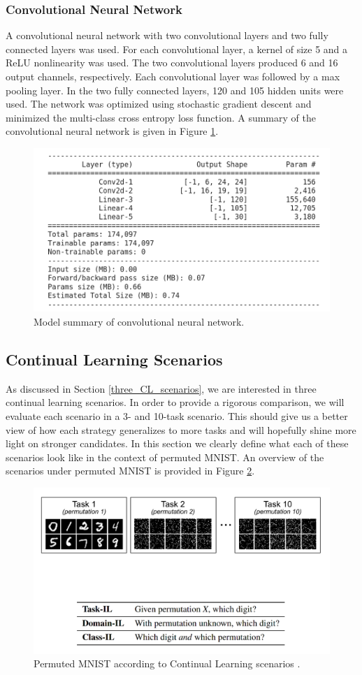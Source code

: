\documentclass{article}
\begin{document}
\subsubsection{Convolutional Neural Network}
A convolutional neural network with two convolutional layers and two fully connected layers was used. For each convolutional layer, a kernel of size 5 and a ReLU nonlinearity was used. The two convolutional layers produced 6 and 16 output channels, respectively. Each convolutional layer was followed by a max pooling layer. In the two fully connected layers, 120 and 105 hidden units were used. The network was optimized using stochastic gradient descent and minimized the multi-class cross entropy loss function. A summary of the convolutional neural network is given in Figure \ref{fig:CNN}. 

\begin{figure}[h]
	\centering
    \includegraphics[width=0.60\linewidth]{CNN}
    \caption{Model summary of convolutional neural network.}
	\label{fig:CNN}
\end{figure}

\subsection{Continual Learning Scenarios}
As discussed in Section \ref{three_CL_scenarios}, we are interested in three continual learning scenarios. In order to provide a rigorous comparison, we will evaluate each scenario in a 3- and 10-task scenario. This should give us a better view of how each strategy generalizes to more tasks and will hopefully shine more light on stronger candidates. In this section we clearly define what each of these scenarios look like in the context of permuted MNIST. An overview of the scenarios under permuted MNIST is provided in Figure \ref{fig:CL_scenarios}.

\begin{figure}[h]
	\centering
    \includegraphics[width=0.60\linewidth]{CL_scenarios}
    \caption{Permuted MNIST according to Continual Learning scenarios \cite{van2019three}.}
	\label{fig:CL_scenarios}
\end{figure}
\end{document}

